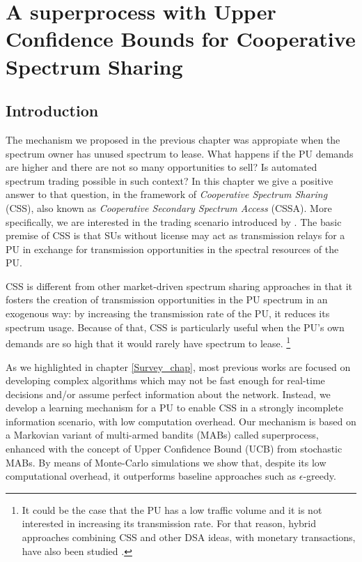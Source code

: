 \graphicspath{ {img/MAB_CSSA/} }
\chapter[A superprocess with Upper Confidence Bounds for Cooperative Spectrum Sharing][A superprocess with UCB for CSS]{A superprocess with Upper Confidence Bounds for Cooperative Spectrum Sharing}\label{MAB_CSSA_chap}

\section{Introduction}
The mechanism we proposed in the previous chapter was appropiate when the spectrum owner has unused spectrum to lease. What happens if the PU demands are higher and there are not so many opportunities to sell? Is automated spectrum trading possible in such context? In this chapter we give a positive answer to that question, in the framework of \textit{Cooperative Spectrum Sharing} (CSS), also known as \textit{Cooperative Secondary Spectrum Access} (CSSA). 
More specifically, we are interested in the trading scenario introduced by \cite{ref:Simeone2008}. 
The basic premise of CSS is that SUs without license may act as transmission relays for a PU in exchange for transmission opportunities in the spectral resources of the PU.

CSS is different from other market-driven spectrum sharing approaches in that it fosters the creation of transmission opportunities in the PU spectrum in an exogenous way: by increasing the transmission rate of the PU, it reduces its spectrum usage. 
Because of that, CSS is particularly useful when the PU's own demands are so high that it would rarely have spectrum to lease.
\footnote{It could be the case that the PU has a low traffic volume and it is not interested in increasing its transmission rate. 
For that reason, hybrid approaches combining CSS and other DSA ideas, with monetary transactions, have also been studied \cite{ref:Zhang2009,ref:Zhang2012_Fair}.}

As we highlighted in chapter \ref{Survey_chap}, most previous works are focused on developing complex algorithms which may not be fast enough for real-time decisions and/or assume perfect information about the network. Instead, we develop a learning mechanism for a PU to enable CSS in a strongly incomplete information scenario, with low computation overhead. Our mechanism is based on a Markovian variant of multi-armed bandits (MABs) called superprocess, enhanced with the concept of Upper Confidence Bound (UCB) from stochastic MABs. By means of Monte-Carlo simulations we show that, despite its low computational overhead, it outperforms baseline approaches such as $\epsilon$-greedy.

